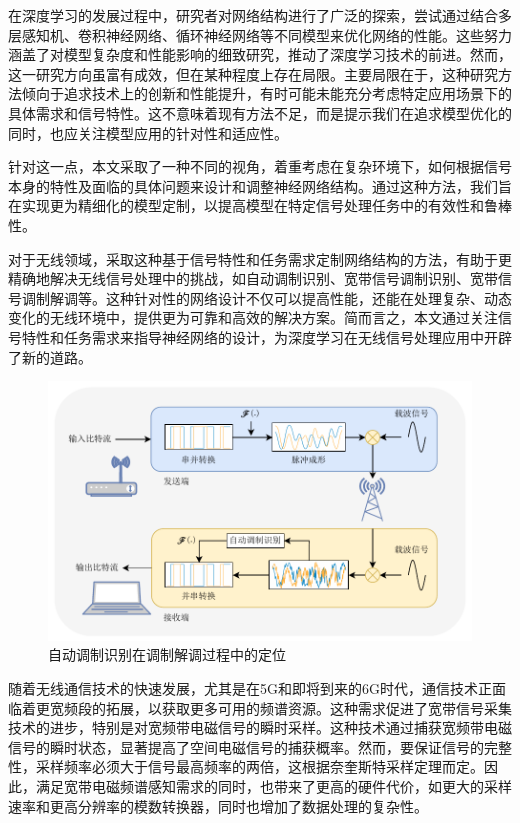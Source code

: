 在深度学习的发展过程中，研究者对网络结构进行了广泛的探索，尝试通过结合多层感知机、卷积神经网络\cite{o2016convolutional}、循环神经网络\cite{rajendran2018deep}等不同模型来优化网络的性能。这些努力涵盖了对模型复杂度和性能影响的细致研究，推动了深度学习技术的前进。然而，这一研究方向虽富有成效，但在某种程度上存在局限。主要局限在于，这种研究方法倾向于追求技术上的创新和性能提升，有时可能未能充分考虑特定应用场景下的具体需求和信号特性。这不意味着现有方法不足，而是提示我们在追求模型优化的同时，也应关注模型应用的针对性和适应性。

针对这一点，本文采取了一种不同的视角，着重考虑在复杂环境下，如何根据信号本身的特性及面临的具体问题来设计和调整神经网络结构。通过这种方法，我们旨在实现更为精细化的模型定制，以提高模型在特定信号处理任务中的有效性和鲁棒性。

对于无线领域，采取这种基于信号特性和任务需求定制网络结构的方法，有助于更精确地解决无线信号处理中的挑战，如自动调制识别、宽带信号调制识别、宽带信号调制解调等。这种针对性的网络设计不仅可以提高性能，还能在处理复杂、动态变化的无线环境中，提供更为可靠和高效的解决方案。简而言之，本文通过关注信号特性和任务需求来指导神经网络的设计，为深度学习在无线信号处理应用中开辟了新的道路。

\begin{figure}
    \centering
    \includegraphics[width=\textwidth]{Image/AMC.pdf}
    \caption{自动调制识别在调制解调过程中的定位}
    \label{fig:AMR}
\end{figure}

随着无线通信技术的快速发展，尤其是在5G和即将到来的6G时代，通信技术正面临着更宽频段的拓展，以获取更多可用的频谱资源\cite{jdid2021machine}。这种需求促进了宽带信号采集技术的进步，特别是对宽频带电磁信号的瞬时采样。这种技术通过捕获宽频带电磁信号的瞬时状态，显著提高了空间电磁信号的捕获概率。然而，要保证信号的完整性，采样频率必须大于信号最高频率的两倍，这根据奈奎斯特采样定理而定。因此，满足宽带电磁频谱感知需求的同时，也带来了更高的硬件代价，如更大的采样速率和更高分辨率的模数转换器，同时也增加了数据处理的复杂性。

